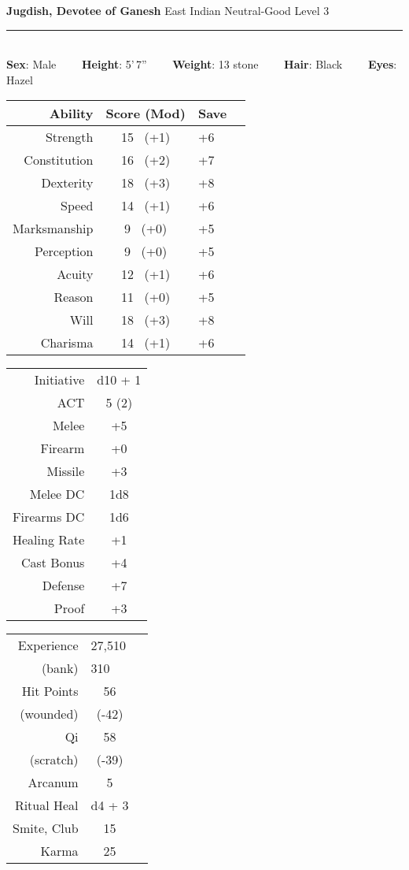 \documentclass[11pt]{article}
\newcommand{\heading}[1]{{\sc\bfseries #1}}
\begin{document}
\pagestyle{empty}
\noindent
{\huge\bfseries Jugdish, Devotee of Ganesh}
\hfill
{\Large East Indian}
\hfill
{\Large Neutral-Good}
\hfill
{\Large Level 3}
\\[-8pt]
\hrule

\mbox{ }
\\[6pt]
\heading{Sex}: Male
\ \ \ \
\heading{Height}: 5'\,7''
\ \ \ \
\heading{Weight}: 13 stone
\ \ \ \
\heading{Hair}: Black
\ \ \ \
\heading{Eyes}: Hazel

\noindent
\begin{tabular}[t]{|r|c|l|c|}
\hline
\heading{Ability}
& \heading{Score (Mod)}
& \heading{Save}
\\ \hline \hline
\sc Strength & 15 \ (+1)
& +6
\\
\sc Constitution & 16 \ (+2)
& +7
\\ \hline
\sc Dexterity & 18 \ (+3)
& +8
\\
\sc Speed & 14 \ (+1)
& +6
\\ \hline
\sc Marksmanship & 9 \ (+0)
& +5
\\
\sc Perception & 9 \ (+0)
& +5
\\
\sc Acuity & 12 \ (+1)
& +6
\\ \hline
\sc Reason & 11 \ (+0)
& +5
\\
\sc Will & 18 \ (+3)
& +8
\\
\sc Charisma & 14 \ (+1)
& +6
\\ \hline
\end{tabular}
\hfill
\begin{tabular}[t]{|r|c|}
\hline
\sc Initiative & d10 + 1
\\
\sc ACT & 5 (2)
\\  \hline
\sc Melee & +5
\\
\sc Firearm & +0
\\
\sc Missile & +3
\\ \hline
\sc Melee DC & 1d8
\\
\sc Firearms DC & 1d6
\\ \hline
\sc Healing Rate & +1
\\ \hline
\sc Cast Bonus & +4
\\ \hline
\sc Defense & +7
\\
\sc Proof & +3
\\ \hline
\end{tabular}
%
\hfill
%
\begin{tabular}[t]{|r|c|c|}
\hline
\sc Experience & \multicolumn{2}{|l|}{27,510}
\\
(bank) & \multicolumn{2}{|l|}{310}
\\ \hline
\sc Hit Points & 56 & \hspace*{8em}
\\
(wounded) & (-42) &
\\[2pt] \hline
\sc Qi &  58 &
\\ (scratch) & (-39) &
\\[2pt] \hline
\sc Arcanum & 5 &
\\[2pt] \hline
\sc Ritual Heal & d4 + 3 &
\\[2pt] \hline
\sc Smite, Club & 15 &
\\[2pt] \hline
\sc Karma & 25 &
\\ \hline
\end{tabular}
\end{document}
